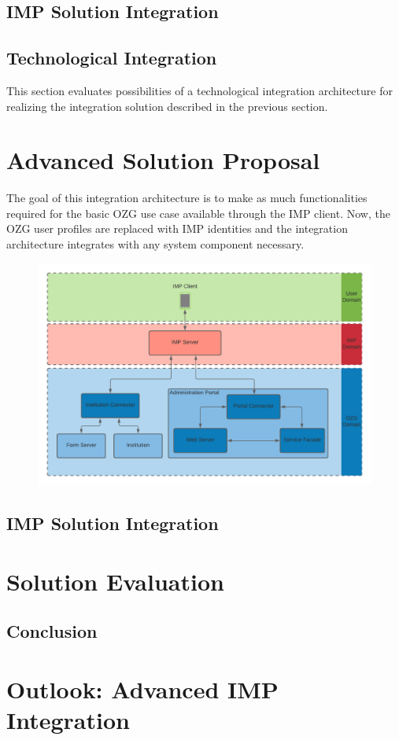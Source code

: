 \documentclass[
     12pt,         %
     a4paper,      %
     BCOR=10mm,version=first,     %
     DIV=14,version=first,        %
     ]{scrreprt}
\begin{document}
\section{IMP Solution Integration}



\section{Technological Integration}

This section evaluates possibilities of a technological integration architecture for realizing the integration solution described in the previous section.




\chapter{Advanced Solution Proposal}

The goal of this integration architecture is to make as much functionalities required for the basic OZG use case available through the IMP client. Now, the OZG user profiles are replaced with IMP identities and the integration architecture integrates with any system component necessary.

\begin{figure}[h]
    \centering
    \includegraphics[scale=0.15]{Diagrams/Integration Architecture 2/Overview.png}
\end{figure}

\section{IMP Solution Integration}



\chapter{Solution Evaluation}

\section{Conclusion}

\chapter{Outlook: Advanced IMP Integration}


\printbibliography
\end{document}
